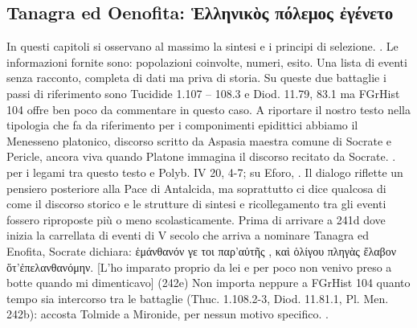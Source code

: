 {            \subsection*{Tanagra ed Oenofita: \textgreek{Ἑλληνικὸς πόλεμος ἐγένετο}}
            In questi capitoli si osservano al massimo la sintesi e i principi di selezione. \cite[553s]{Sordi2002}. Le informazioni fornite sono: popolazioni coinvolte,  numeri,  esito. Una lista di eventi senza racconto, completa di dati ma priva di storia.  Su queste due battaglie i passi di riferimento sono  Tucidide 1.107 – 108.3 e  Diod. 11.79, 83.1 ma FGrHist 104 offre ben poco da commentare in questo caso. A riportare il nostro testo nella tipologia che fa da riferimento per i componimenti epidittici abbiamo il Menesseno  platonico, discorso scritto da Aspasia maestra comune di Socrate e Pericle, ancora viva quando Platone immagina il discorso recitato da Socrate. \cite[140s]{Nouhaud1982}. per i legami tra questo testo e Polyb. IV 20, 4-7; su Eforo, \cite[87]{Parmeggiani2011}. Il dialogo riflette un pensiero posteriore alla Pace di Antalcida, ma soprattutto ci dice qualcosa di come il discorso storico e le strutture di sintesi e ricollegamento tra gli eventi fossero riproposte più o meno scolasticamente. Prima di arrivare a 241d dove inizia la carrellata di eventi di V secolo che arriva a nominare Tanagra ed Enofita, Socrate dichiara: \textgreek{ἑμάνθανόν γε τοι παρ’αὐτῆς , καὶ ὁλίγου πληγὰς ἔλαβον ὅτ’ἐπελανθανόμην}. [L'ho imparato proprio da lei e per poco non venivo preso a botte quando mi dimenticavo] (242e) Non importa neppure a FGrHist 104 quanto tempo sia intercorso tra le battaglie (Thuc. 1.108.2-3, Diod. 11.81.1, Pl. Men. 242b): accosta Tolmide a Mironide, per nessun motivo specifico. \cite[50-51]{Ferretto1984}.
}
